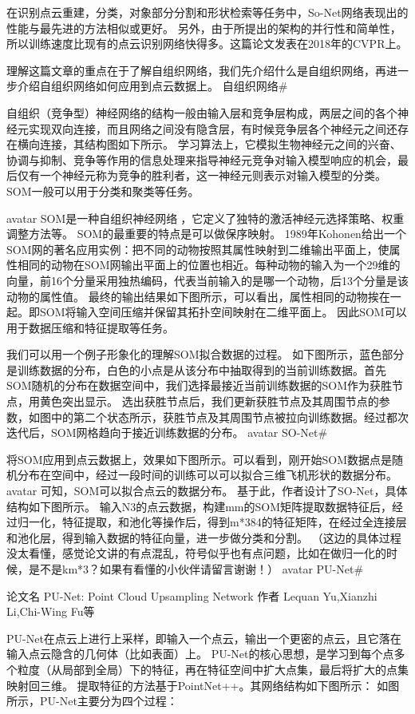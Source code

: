 \documentclass{amsart}
\begin{document}
    在识别点云重建，分类，对象部分分割和形状检索等任务中，So-Net网络表现出的性能与最先进的方法相似或更好。
    另外，由于所提出的架构的并行性和简单性，所以训练速度比现有的点云识别网络快得多。这篇论文发表在2018年的CVPR上。

理解这篇文章的重点在于了解自组织网络，我们先介绍什么是自组织网络，再进一步介绍自组织网络如何应用到点云数据上。
自组织网络#

自组织（竞争型）神经网络的结构一般由输入层和竞争层构成，两层之间的各个神经元实现双向连接，而且网络之间没有隐含层，有时候竞争层各个神经元之间还存在横向连接，其结构图如下所示。
学习算法上，它模拟生物神经元之间的兴奋、协调与抑制、竞争等作用的信息处理来指导神经元竞争对输入模型响应的机会，最后仅有一个神经元称为竞争的胜利者，这一神经元则表示对输入模型的分类。
SOM一般可以用于分类和聚类等任务。

avatar
SOM是一种自组织神经网络，它定义了独特的激活神经元选择策略、权重调整方法等。
SOM的最重要的特点是可以做保序映射。
1989年Kohonen给出一个SOM网的著名应用实例：把不同的动物按照其属性映射到二维输出平面上，使属性相同的动物在SOM网输出平面上的位置也相近。每种动物的输入为一个29维的向量，前16个分量采用独热编码，代表当前输入的是哪一个动物，后13个分量是该动物的属性值。
最终的输出结果如下图所示，可以看出，属性相同的动物挨在一起。即SOM将输入空间压缩并保留其拓扑空间映射在二维平面上。
因此SOM可以用于数据压缩和特征提取等任务。

我们可以用一个例子形象化的理解SOM拟合数据的过程。
如下图所示，蓝色部分是训练数据的分布，白色的小点是从该分布中抽取得到的当前训练数据。首先SOM随机的分布在数据空间中，我们选择最接近当前训练数据的SOM作为获胜节点，用黄色突出显示。
选出获胜节点后，我们更新获胜节点及其周围节点的参数，如图中的第二个状态所示，获胜节点及其周围节点被拉向训练数据。经过都次迭代后，SOM网格趋向于接近训练数据的分布。
avatar
SO-Net#

将SOM应用到点云数据上，效果如下图所示。可以看到，刚开始SOM数据点是随机分布在空间中，经过一段时间的训练可以可以拟合三维飞机形状的数据分布。
avatar
可知，SOM可以拟合点云的数据分布。
基于此，作者设计了SO-Net，具体结构如下图所示。
输入N3的点云数据，构建mm的SOM矩阵提取数据特征后，经过归一化，特征提取，和池化等操作后，得到m*384的特征矩阵，在经过全连接层和池化层，得到输入数据的特征向量，进一步做分类和分割。
（这边的具体过程没太看懂，感觉论文讲的有点混乱，符号似乎也有点问题，比如在做归一化的时候，是不是km*3？如果有看懂的小伙伴请留言谢谢！）
avatar
PU-Net#

    论文名 PU-Net: Point Cloud Upsampling Network
    作者 Lequan Yu,Xianzhi Li,Chi-Wing Fu等

    PU-Net在点云上进行上采样，即输入一个点云，输出一个更密的点云，且它落在输入点云隐含的几何体（比如表面）上。
    PU-Net的核心思想，是学习到每个点多个粒度（从局部到全局）下的特征，再在特征空间中扩大点集，最后将扩大的点集映射回三维。
    提取特征的方法基于PointNet++。其网络结构如下图所示：
如图所示，PU-Net主要分为四个过程：
\end{document}
